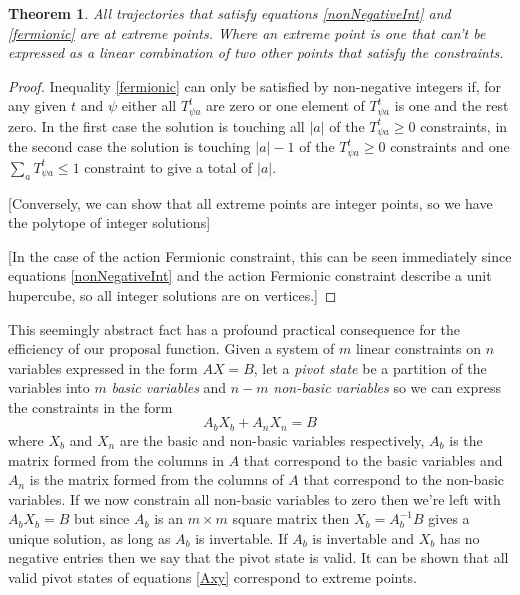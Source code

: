 \documentclass{article}
\newtheorem{theorem}{Theorem}
\begin{document}
\begin{theorem}
All trajectories that satisfy equations \ref{nonNegativeInt} and \ref{fermionic} are at extreme points. Where an extreme point is one that can't be expressed as a linear combination of two other points that satisfy the constraints.
\end{theorem}
\begin{proof}

Inequality \ref{fermionic} can only be satisfied by non-negative integers if, for any given $t$ and $\psi$ either all $T^t_{\psi a}$ are zero or one element of $T^t_{\psi a}$ is one and the rest zero. In the first case the solution is touching all $|a|$ of the $T^t_{\psi a} \ge 0$ constraints, in the second case the solution is touching $|a|-1$ of the $T^t_{\psi a} \ge 0$ constraints and one $\sum_a T^t_{\psi a} \le 1$ constraint to give a total of $|a|$.

[Conversely, we can show that all extreme points are integer points, so we have the polytope of integer solutions]

[In the case of the action Fermionic constraint, this can be seen immediately since equations \ref{nonNegativeInt} and the action Fermionic constraint describe a unit hupercube, so all integer solutions are on vertices.]

\end{proof}


This seemingly abstract fact has a profound practical consequence for the efficiency of our proposal function.
Given a system of $m$ linear constraints on $n$ variables expressed in the form $AX=B$, let a \textit{pivot state} be a partition of the variables into $m$ \textit{basic variables} and $n-m$ \textit{non-basic variables} so we can express the constraints in the form
\begin{equation}
A_bX_b + A_nX_n = B
\label{tableau1}
\end{equation}
where $X_b$ and $X_n$ are the basic and non-basic variables respectively, $A_b$ is the matrix formed from the columns in $A$ that correspond to the basic variables and $A_n$ is the matrix formed from the columns of $A$ that correspond to the non-basic variables. If we now constrain all non-basic variables to zero then we're left with $A_bX_b = B$ but since $A_b$ is an $m \times m$ square matrix then $X_b = A_b^{-1}B$ gives a unique solution, as long as $A_b$ is invertable. If $A_b$ is invertable and $X_b$ has no negative entries then we say that the pivot state is valid. It can be shown that all valid pivot states of equations \ref{Axy} correspond to extreme points\cite{dantzig1955generalized}.
\end{document}
